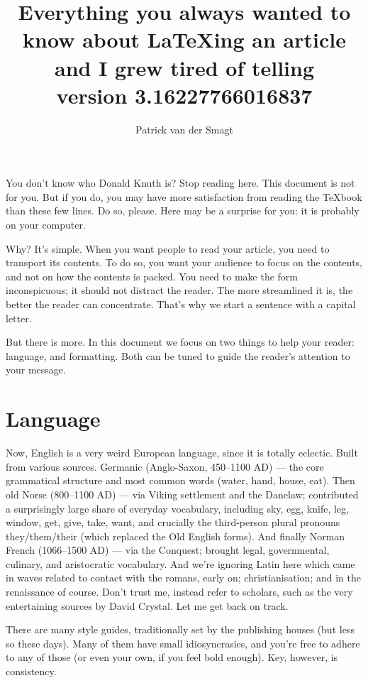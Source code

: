\documentclass{article}
\title{Everything you always wanted to know about \LaTeX ing an article 
and I grew tired of telling\\[1ex]
\footnotesize{version 3.16227766016837}}
\author{Patrick van der Smagt}
\begin{document}
\maketitle

You don't know who Donald Knuth is?  Stop reading here.  This document is 
not for you.  But if you do, you may have more satisfaction from reading 
the \TeX book than these few lines.   Do so, please. Here may be a surprise for you: it is probably on your computer.

Why?
It's simple.
When you want people to read your article, you need to transport its contents. 
To do so, you want your audience to focus on the contents, and not on how the contents is packed.
You need to make the form inconspicuous; it should not distract the reader.
The more streamlined it is, the better the reader can concentrate.
That's why we start a sentence with a capital letter.

But there is more.  In this document we focus on two things to help your reader: language, and formatting.  Both can be tuned to guide the reader's attention to your message.



\section{Language}
Now, English is a very weird European language, since it is totally eclectic.  Built from various sources.  
Germanic (Anglo-Saxon, 450–1100 AD) — the core grammatical structure and most common words (water, hand, house, eat). Then old Norse (800–1100 AD) — via Viking settlement and the Danelaw; contributed a surprisingly large share of everyday vocabulary, including sky, egg, knife, leg, window, get, give, take, want, and crucially the third-person plural pronouns they/them/their (which replaced the Old English forms). And finally
Norman French (1066–1500 AD) — via the Conquest; brought legal, governmental, culinary, and aristocratic vocabulary. And we're ignoring Latin here which came in waves related to contact with the romans, early on; christianisation; and in the renaissance of course. Don't trust me, instead refer to scholars, such as the very entertaining sources by David Crystal. Let me get back on track.


There are many style guides, traditionally set by the publishing houses (but less so these days).
Many of them have small idiosyncrasies, and you're free to adhere to any of those (or even your own, if you feel bold enough).
Key, however, is consistency.
\end{document}
